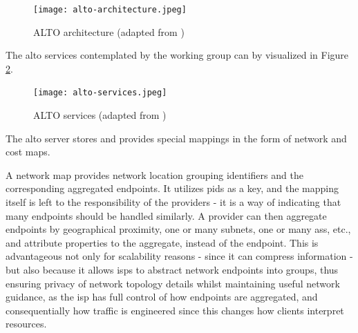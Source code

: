     \begin{figure}[H]
    \centering
    \texttt{[image: alto-architecture.jpeg]}
    \caption{ALTO architecture (adapted from \cite{alto-protocol})}
    \label{fig:alto-architecture}
    \end{figure}

    The \gls{alto} services contemplated by the working group can by visualized in Figure \ref{fig:alto-services}.

    \begin{figure}[H]
    \centering
    \texttt{[image: alto-services.jpeg]}
    \caption{ALTO services (adapted from \cite{alto-protocol}) }
    \label{fig:alto-services}
    \end{figure}

    The \gls{alto} server stores and provides special mappings in the form of network and cost maps.

    A network map provides network location grouping identifiers and the corresponding aggregated endpoints.
    It utilizes \glspl{pid} as a key, and the mapping itself is left to the responsibility of the providers - it is a way of indicating that many endpoints should be handled similarly.
    A provider can then aggregate endpoints by geographical proximity, one or many subnets, one or many \glspl{as}, etc., and attribute properties to the aggregate, instead of the endpoint.
    This is advantageous not only for scalability reasons - since it can compress information - but also because it allows \glspl{isp} to abstract network endpoints into groups, thus ensuring privacy of network topology details whilst maintaining useful network guidance, as the \gls{isp} has full control of how endpoints are aggregated, and consequentially how traffic is engineered since this changes how clients interpret resources.

